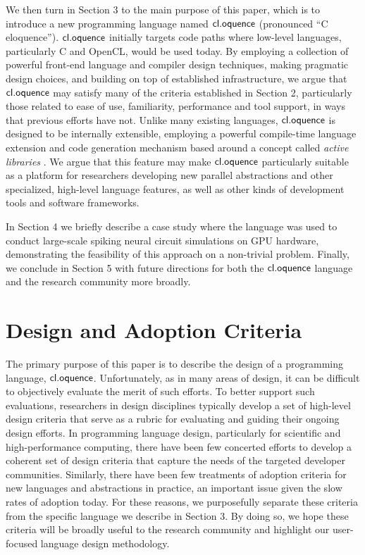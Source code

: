 \documentclass{llncs}
\begin{document}
We then turn in Section 3 to the main purpose of this paper, which is to introduce a new programming language named $\textsf{cl.oquence}$ (pronounced ``C eloquence''). $\textsf{cl.oquence}$ initially targets code paths where low-level languages, particularly C and OpenCL, would be used today. By employing a collection of powerful front-end language and compiler design techniques, making pragmatic design choices, and building on top of established infrastructure, we argue that $\textsf{cl.oquence}$ may satisfy many of the criteria established in Section 2, particularly those related to ease of use, familiarity, performance and tool support, in ways that previous efforts have not. Unlike many existing languages, $\textsf{cl.oquence}$ is designed to be internally extensible, employing a powerful compile-time language extension and code generation mechanism based around a concept called {\it active libraries} \cite{activelibraries}. We argue that this feature may make $\textsf{cl.oquence}$ particularly suitable as a platform for researchers developing new parallel abstractions and other specialized, high-level language features, as well as  other kinds of development tools and software frameworks.

In Section 4 we briefly describe a case study where the language was used to conduct large-scale spiking neural circuit simulations on GPU hardware, demonstrating the feasibility of this approach on a non-trivial problem. Finally, we conclude in Section 5 with future directions for both the $\textsf{cl.oquence}$ language and the research community more broadly. 

\section{Design and Adoption Criteria}
The primary purpose of this paper is to describe the design of a programming language, $\textsf{cl.oquence}$. Unfortunately, as in many areas of design, it can be difficult to objectively evaluate the merit of such efforts. To better support such evaluations, researchers in design disciplines typically develop a set of high-level  design criteria that serve as a rubric for evaluating and guiding their ongoing design efforts. In programming language design, particularly for scientific and high-performance computing, there have been few concerted efforts to develop a coherent set of design criteria that capture the needs of the targeted developer communities. Similarly, there have been few treatments of adoption criteria for new languages and abstractions in practice, an important issue given the slow rates of adoption today. For these reasons, we purposefully separate these criteria from the specific language we describe in Section 3. By doing so, we hope these criteria will be broadly useful to the research community and highlight our user-focused language design methodology.
\end{document}
